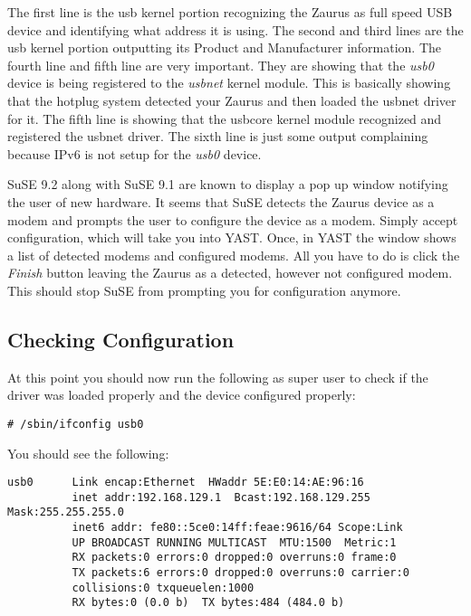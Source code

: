 \documentclass{article}
\begin{document}
The first line is the usb kernel portion recognizing the Zaurus as full speed
USB device and identifying what address it is using. The second and third
lines are the usb kernel portion outputting its Product and Manufacturer
information. The fourth line and fifth line are very important. They are
showing that the \emph{usb0} device is being registered to the \emph{usbnet}
kernel module. This is basically showing that the hotplug system detected your
Zaurus and then loaded the usbnet driver for it. The fifth line is showing
that the usbcore kernel module recognized and registered the usbnet driver.
The sixth line is just some output complaining because IPv6 is not setup for
the \emph{usb0} device.

SuSE 9.2 along with SuSE 9.1 are known to display a pop up window notifying
the user of new hardware. It seems that SuSE detects the Zaurus device as a
modem and prompts the user to configure the device as a modem. Simply accept
configuration, which will take you into YAST. Once, in YAST the window shows a
list of detected modems and configured modems. All you have to do is click the
\emph{Finish} button leaving the Zaurus as a detected, however not configured
modem. This should stop SuSE from prompting you for configuration anymore.

\subsection{Checking Configuration}

At this point you should now run the following as super user to check if the
driver was loaded properly and the device configured properly:

\begin{verbatim}
# /sbin/ifconfig usb0
\end{verbatim}

You should see the following:

\begin{verbatim}
usb0      Link encap:Ethernet  HWaddr 5E:E0:14:AE:96:16
          inet addr:192.168.129.1  Bcast:192.168.129.255  Mask:255.255.255.0
          inet6 addr: fe80::5ce0:14ff:feae:9616/64 Scope:Link
          UP BROADCAST RUNNING MULTICAST  MTU:1500  Metric:1
          RX packets:0 errors:0 dropped:0 overruns:0 frame:0
          TX packets:6 errors:0 dropped:0 overruns:0 carrier:0
          collisions:0 txqueuelen:1000
          RX bytes:0 (0.0 b)  TX bytes:484 (484.0 b)
\end{verbatim}
\end{document}
